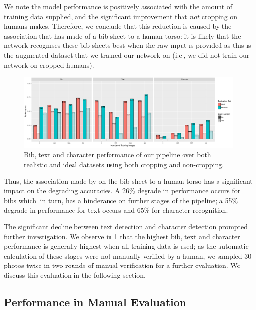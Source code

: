 We note the model performance is positively associated with the amount of training data supplied, and the significant improvement that \textit{not} cropping on humans makes. Therefore, we conclude that this reduction is caused by the association that \frcnn{} has made of a bib sheet to a human torso: it is likely that the network recognises these bib sheets best when the raw input is provided as this is the augmented dataset that we trained our network on (i.e., we did not train our network on cropped humans).

\begin{landscape}

\begin{figure}
  \centering
  \includegraphics[width=1.15\paperwidth]{images/evaluation/DetectionAll}
  \caption[Bib, text and character performance]{Bib, text and character performance of our pipeline over both realistic and ideal datasets using both cropping and non-cropping.}
  \label{fig:evaluation:results:performance_all}
\end{figure}

\end{landscape}

Thus, the association made by \frcnn{} on the bib sheet to a human torso has a significant impact on the degrading accuracies. A 26\% degrade in performance occurs for bibs which, in turn, has a hinderance on further stages of the pipeline; a 55\% degrade in performance for text occurs and 65\% for character recognition.

The significant decline between text detection and character detection prompted further investigation. We observe in \cref{fig:evaluation:results:performance_all} that the highest bib, text and character performance is generally highest when all training data is used; as the automatic calculation of these stages were not manually verified by a human, we sampled 30 photos twice in two rounds of manual verification for a further evaluation. We discuss this evaluation in the following section.

\subsection{Performance in Manual Evaluation}

